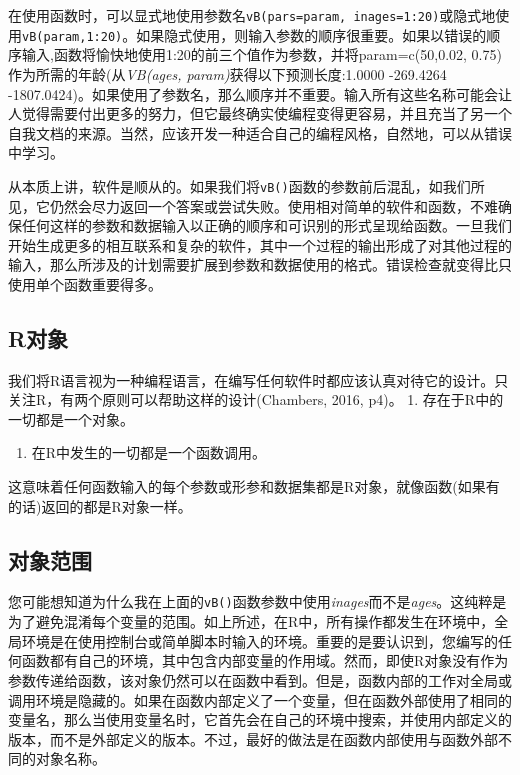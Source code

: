 \documentclass[
  lang=cn,
  11pt,
  scheme=chinese,
  chinesefont=nofont,
  citestyle=gb7714-2015,
  bibstyle=gb7714-2015]{elegantbook}
\providecommand{\tightlist}{%
  \setlength{\itemsep}{0pt}\setlength{\parskip}{0pt}}
\begin{document}
在使用函数时，可以显式地使用参数名\texttt{vB(pars=param,\ inages=1:20)}或隐式地使用\texttt{vB(param,1:20)}。如果隐式使用，则输入参数的顺序很重要。如果以错误的顺序输入,函数将愉快地使用1:20的前三个值作为参数，并将param=c(50,0.02, 0.75)作为所需的年龄(从\emph{VB(ages, param)}获得以下预测长度:1.0000 -269.4264 -1807.0424)。如果使用了参数名，那么顺序并不重要。输入所有这些名称可能会让人觉得需要付出更多的努力，但它最终确实使编程变得更容易，并且充当了另一个自我文档的来源。当然，应该开发一种适合自己的编程风格，自然地，可以从错误中学习。

从本质上讲，软件是顺从的。如果我们将\texttt{vB()}函数的参数前后混乱，如我们所见，它仍然会尽力返回一个答案或尝试失败。使用相对简单的软件和函数，不难确保任何这样的参数和数据输入以正确的顺序和可识别的形式呈现给函数。一旦我们开始生成更多的相互联系和复杂的软件，其中一个过程的输出形成了对其他过程的输入，那么所涉及的计划需要扩展到参数和数据使用的格式。错误检查就变得比只使用单个函数重要得多。

\subsection{R对象}\label{rux5bf9ux8c61}

我们将R语言视为一种编程语言，在编写任何软件时都应该认真对待它的设计。只关注R，有两个原则可以帮助这样的设计(Chambers, 2016, p4)。 1. 存在于R中的一切都是一个对象。

\begin{enumerate}
\def\labelenumi{\arabic{enumi}.}
\setcounter{enumi}{1}
\tightlist
\item
  在R中发生的一切都是一个函数调用。
\end{enumerate}

这意味着任何函数输入的每个参数或形参和数据集都是R对象，就像函数(如果有的话)返回的都是R对象一样。

\subsection{对象范围}\label{ux5bf9ux8c61ux8303ux56f4}

您可能想知道为什么我在上面的\texttt{vB()}函数参数中使用\emph{inages}而不是\emph{ages}。这纯粹是为了避免混淆每个变量的范围。如上所述，在R中，所有操作都发生在环境中，全局环境是在使用控制台或简单脚本时输入的环境。重要的是要认识到，您编写的任何函数都有自己的环境，其中包含内部变量的作用域。然而，即使R对象没有作为参数传递给函数，该对象仍然可以在函数中看到。但是，函数内部的工作对全局或调用环境是隐藏的。如果在函数内部定义了一个变量，但在函数外部使用了相同的变量名，那么当使用变量名时，它首先会在自己的环境中搜索，并使用内部定义的版本，而不是外部定义的版本。不过，最好的做法是在函数内部使用与函数外部不同的对象名称。
\end{document}
